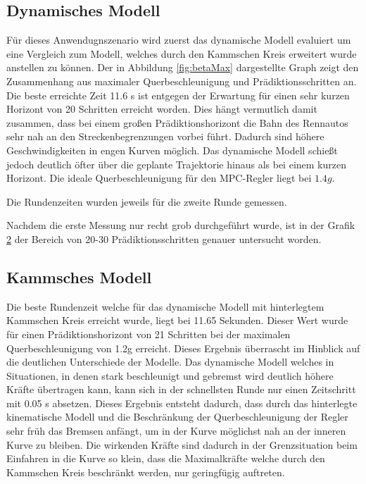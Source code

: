 \documentclass{like}
\begin{document}
\subsection{Dynamisches Modell}
Für dieses Anwendugnszenario wird zuerst das dynamische Modell evaluiert um eine Vergleich zum Modell, welches durch den Kammschen Kreis erweitert wurde anstellen zu können.
Der in Abbildung \ref{fig:betaMax} dargestellte Graph zeigt den Zusammenhang aus maximaler Querbeschleunigung und Prädiktionsschritten an. Die beste erreichte Zeit 11.6 s ist entgegen der Erwartung für einen sehr kurzen Horizont von 20 Schritten erreicht worden. Dies hängt vermutlich damit zusammen, dass bei einem großen Prädiktionshorizont die Bahn des Rennautos sehr nah an den Streckenbegrenzungen vorbei führt. Dadurch sind höhere Geschwindigkeiten in engen Kurven möglich. Das dynamische Modell schießt jedoch deutlich öfter über die geplante Trajektorie hinaus als bei einem kurzen Horizont. Die ideale Querbeschleunigung für den \ac{MPC}-Regler liegt bei $1.4 g$.  
  
\begin{figure}
	\centering
	 
	\caption{}
	\label{fig:betaMaxN}
\end{figure}

Die Rundenzeiten wurden jeweils für die zweite Runde gemessen.

Nachdem die erste Messung nur recht grob durchgeführt wurde, ist in der Grafik \ref{fig:betaMaxFine} der Bereich von 20-30 Prädiktionsschritten genauer untersucht worden.

\begin{figure}
	\centering
	 
	\caption{}
	\label{fig:betaMaxFine}
\end{figure}

\subsection{Kammsches Modell}

Die beste Rundenzeit welche für das dynamische Modell mit hinterlegtem Kammschen Kreis erreicht wurde, liegt bei 11.65 Sekunden. Dieser Wert wurde für einen Prädiktionshorizont von 21 Schritten bei der maximalen Querbeschleunigung von 1.2g erreicht. Dieses Ergebnis überrascht im Hinblick auf die deutlichen Unterschiede der Modelle. Das dynamische Modell welches in Situationen, in denen stark beschleunigt und gebremst wird deutlich höhere Kräfte übertragen kann, kann sich in der schnellsten Runde nur einen Zeitschritt mit 0.05 s absetzen. Dieses Ergebnis entsteht dadurch, dass durch das hinterlegte kinematische Modell und die Beschränkung der Querbeschleunigung der Regler sehr früh das Bremsen anfängt, um in der Kurve möglichst nah an der inneren Kurve zu bleiben. Die wirkenden Kräfte sind dadurch in der Grenzsituation beim Einfahren in die Kurve so klein, dass die Maximalkräfte welche durch den Kammschen Kreis beschränkt werden, nur geringfügig auftreten.
\begin{figure}
	\centering
	 
	\caption{}
	\label{fig:betaMaxFineKam}
\end{figure}
\end{document}
